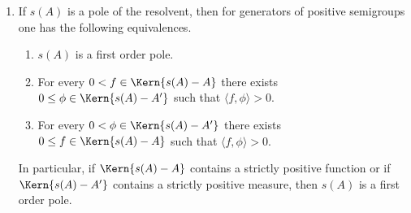 \begin{remarks}\label{rem:b3-2.15}
%
	
	\begin{enumerate}[\upshape (i), wide, labelindent=.25em]
	\item
	If\/ $s(A)$ is a pole of the resolvent, then for generators of positive semigroups one has the following equivalences.%
	
	\begin{enumerate}[\upshape (a)]
		\item 
		$s(A)$ is a first order pole.
		
		\item 
		For every $0 < f \in \Kern{s(A) - A}$ there exists $0 \leq \phi \in \Kern{s(A) - A'}$ such that $\langle f,\phi \rangle > 0$.
		
		\item 
		For every $0 < \phi \in \Kern{s(A) - A'}$ there exists $0 \leq f \in \Kern{s(A) - A}$ such that $\langle f,\phi \rangle > 0$.
	\end{enumerate}
	In particular, if\/ $\Kern{s(A) - A}$ contains a strictly positive function or if\/ $\Kern{s(A) - A'}$ contains a strictly positive measure, then $s(A)$ is a first order pole.


\end{enumerate}
\end{remarks}
